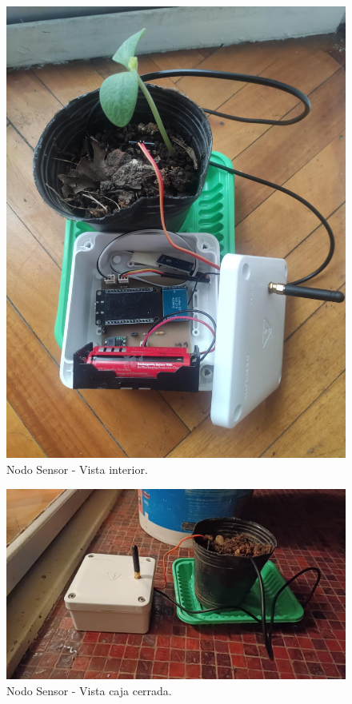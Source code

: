 \begin{figure}[H]
	\centering
	\includegraphics[scale=0.25]{Figures/Pruebas/nodoSensor2.jpeg}
	\caption{Nodo Sensor - Vista interior.}
	\label{fig:nodoSensor1EstFinal}
\end{figure}

\begin{figure}[H]
	\centering
	\includegraphics[scale=0.25]{Figures/Pruebas/nodoSensor1.jpeg}
	\caption{Nodo Sensor - Vista caja cerrada.}
	\label{fig:nodoSensor2EstFinal}
\end{figure}


